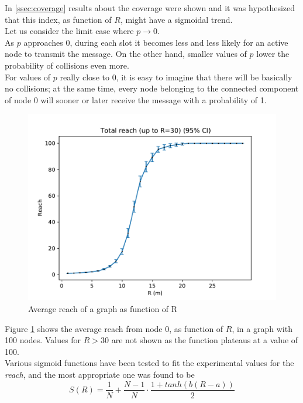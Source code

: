 In \ref{ssec:coverage} results about the coverage were shown and it was hypothesized that this index, as function of $R$, might have a sigmoidal trend.\\
Let us consider the limit case where $p \to 0$.\\
As $p$ approaches 0, during each slot it becomes less and less likely for an active node to transmit the message. On the other hand, smaller values of $p$ lower the probability of collisions even more.\\
For values of $p$ really close to 0, it is easy to imagine that there will be basically no collisions; at the same time, every node belonging to the connected component of node 0 will sooner or later receive the message with a probability of 1.\\
\begin{figure}[H]
    \begin{center}
        \includegraphics[scale=.6]{img/graphAnalysisTotal_reachR30.pdf}
    \end{center}
    \vspace*{-0.5cm}
    \caption{Average reach of a graph as function of R}
    \label{fig:reachR30}
\end{figure}
\hfill \break
Figure \ref{fig:reachR30} shows the average reach from node 0, as function of $R$, in a graph with 100 nodes. Values for $R>30$ are not shown as the function plateaus at a value of 100. \\
Various sigmoid functions have been tested to fit the experimental values for the \textit{reach}, and the most appropriate one was found to be
\hfill \break
\begin{equation}\label{eq:reachSigmoidParametric}
	S(R) = \frac{1}{N} + \frac{N-1}{N}\cdot\frac{1+tanh(b(R-a))}{2}
\end{equation}
